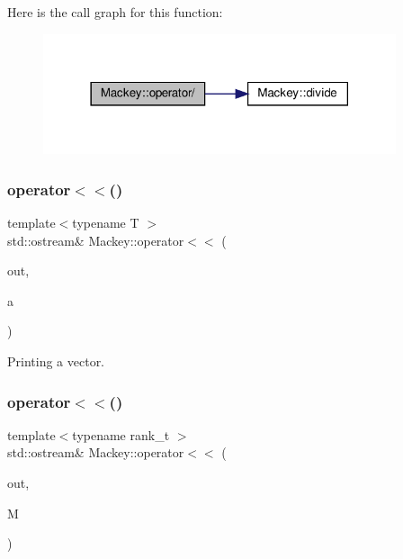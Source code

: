 Here is the call graph for this function\+:\nopagebreak
\begin{figure}[H]
\begin{center}
\leavevmode
\includegraphics[width=294pt]{namespaceMackey_ac26fb6e8a8b7350d13f866570d588e6c_cgraph}
\end{center}
\end{figure}
\mbox{\label{namespaceMackey_aa4da3e3b46b9cb20f3be57d7e5da2d5d}} 
\subsubsection{\texorpdfstring{operator$<$$<$()}{operator<<()}\hspace{0.1cm}{\footnotesize\ttfamily [1/2]}}
{\footnotesize\ttfamily template$<$typename T $>$ \\
std\+::ostream\& Mackey\+::operator$<$$<$ (\begin{DoxyParamCaption}\item[{std\+::ostream \&}]{out,  }\item[{const std\+::vector$<$ T $>$ \&}]{a }\end{DoxyParamCaption})}



Printing a vector. 

\mbox{\label{namespaceMackey_aaf9e6d978fdb55a757223964390b2fc0}} 
\subsubsection{\texorpdfstring{operator$<$$<$()}{operator<<()}\hspace{0.1cm}{\footnotesize\ttfamily [2/2]}}
{\footnotesize\ttfamily template$<$typename rank\+\_\+t $>$ \\
std\+::ostream\& Mackey\+::operator$<$$<$ (\begin{DoxyParamCaption}\item[{std\+::ostream \&}]{out,  }\item[{const \hyperlink{classMackey_1_1MackeyFunctor}{Mackey\+Functor}$<$ rank\+\_\+t $>$ \&}]{M }\end{DoxyParamCaption})}

